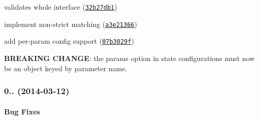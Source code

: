 {{{{\begin{DoxyItemize}
\begin{DoxyItemize}
\item validates whole interface (\href{https://github.com/angular-ui/ui-router/commit/32b27db173722e9194ef1d5c0ea7d93f25a98d11}{\tt 32b27db1})
\item implement non-\/strict matching (\href{https://github.com/angular-ui/ui-router/commit/a3e21366bee0475c9795a1ec76f70eec41c5b4e3}{\tt a3e21366})
\item add per-\/param config support (\href{https://github.com/angular-ui/ui-router/commit/07b3029f4d409cf955780113df92e36401b47580}{\tt 07b3029f})
\begin{DoxyItemize}
\item {\bfseries B\+R\+E\+A\+K\+I\+NG C\+H\+A\+N\+GE}\+: the {\ttfamily params} option in state configurations must now be an object keyed by parameter name.
\end{DoxyItemize}
\end{DoxyItemize}
\end{DoxyItemize}}}}}

{\bfseries {\bfseries {\bfseries {\bfseries \subsubsection*{0.. (2014-\/03-\/12)}}}}}

{\bfseries {\bfseries {\bfseries {\bfseries }}}}

{\bfseries {\bfseries {\bfseries {\bfseries \paragraph*{Bug Fixes}}}}}

{\bfseries {\bfseries {\bfseries {\bfseries }}}}

